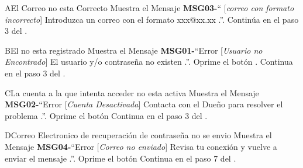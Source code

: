 	\begin{UCtrayectoriaA}{A}{El Correo no esta Correcto}
			\UCpaso Muestra el Mensaje {\bf MSG03-}`` [{\em correo con formato incorrecto}] Introduzca un correo con el formato xxx@xx.xx .''.
			\UCpaso Continúa en el paso 3 del .
		\end{UCtrayectoriaA}
		\begin{UCtrayectoriaA}{B}{El \UCactor no esta registrado}
			\UCpaso Muestra el Mensaje {\bf MSG01-}``Error [{\em Usuario no Encontrado}] El usuario y/o contraseña no existen .''.
			\UCpaso[\UCactor] Oprime el botón .
			\UCpaso[] Continua en el paso 3 del .
		\end{UCtrayectoriaA}		
		\begin{UCtrayectoriaA}{C}{La cuenta a la que intenta acceder no esta activa}
			\UCpaso Muestra el Mensaje {\bf MSG02-}``Error [{\em Cuenta Desactivada}] Contacta con el Dueño para resolver el problema .''.
			\UCpaso[\UCactor] Oprime el botón 
			\UCpaso Continua en el paso 3 del .
		\end{UCtrayectoriaA}
	\begin{UCtrayectoriaA}{D}{Correo Electronico de recuperación de contraseña no se envio}
			\UCpaso Muestra el Mensaje {\bf MSG04-}``Error [{\em Correo no enviado}] Revisa tu conexión y vuelve a enviar el mensaje .''.
			\UCpaso[\UCactor] Oprime el botón 
			\UCpaso Continua en el paso 7 del .
		\end{UCtrayectoriaA}


		
